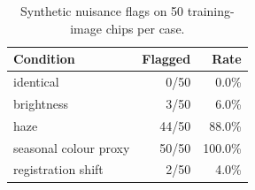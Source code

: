 \begin{table}[t]
\caption{Synthetic nuisance flags on 50 training-image chips per case.}
\label{tab:perturbation}
\centering
\begin{tabular}{lrr}
\hline
Condition & Flagged & Rate \\
\hline
identical & 0/50 & 0.0\% \\
brightness & 3/50 & 6.0\% \\
haze & 44/50 & 88.0\% \\
seasonal colour proxy & 50/50 & 100.0\% \\
registration shift & 2/50 & 4.0\% \\
\hline
\end{tabular}
\end{table}
